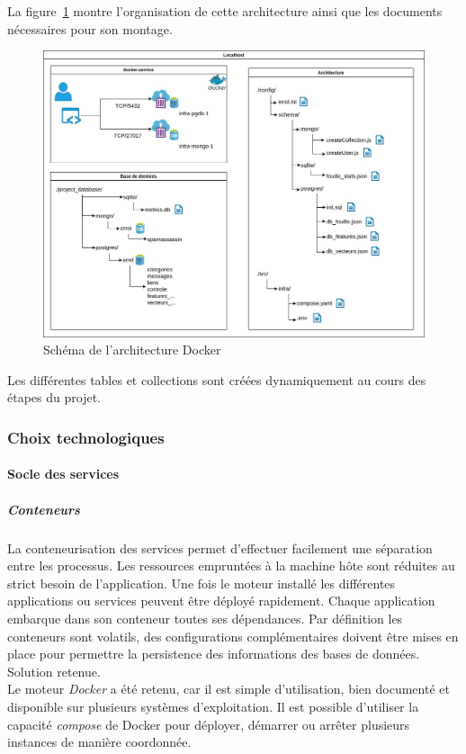 	La figure~\ref{fig:Docker} montre l'organisation de cette architecture ainsi que les documents nécessaires pour son montage.
	\begin{figure}[H]
		\includegraphics[width=\linewidth]{img/SchemaDocker}
		\caption{Schéma de l'architecture Docker}
		\label{fig:Docker}
	\end{figure}

	Les différentes tables et collections sont créées dynamiquement au cours des étapes du projet.

	\subsubsection*{Choix technologiques}
		\paragraph{Socle des services} 
			\subparagraph{Conteneurs}
				La conteneurisation des services permet d'effectuer facilement une séparation entre les processus.
				Les ressources empruntées à la machine hôte sont réduites au strict besoin de l'application.
				Une fois le moteur installé les différentes applications ou services peuvent être déployé rapidement.
				Chaque application embarque dans son conteneur toutes ses dépendances.
				Par définition les conteneurs sont volatils, des configurations complémentaires doivent être mises en place pour permettre la persistence des informations des bases de données.
				Solution retenue. \\
				Le moteur \emph{Docker} a été retenu, car il est simple d'utilisation, bien documenté et disponible sur plusieurs systèmes d'exploitation.
				Il est possible d'utiliser la capacité \emph{compose} de Docker pour déployer, démarrer ou arrêter plusieurs instances de manière coordonnée.

